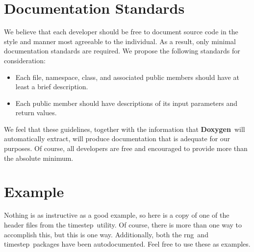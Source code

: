 \documentclass[11pt]{nmemo}
\newcommand{\doxy}{{\normalfont\bfseries Doxygen}}
\newcommand{\rng}{{\normalfont\sffamily rng}}
\newcommand{\timestep}{{\normalfont\sffamily timestep}}
\begin{document}
\section{Documentation Standards}

We believe that each developer should be free to document source code
in the style and manner most agreeable to the individual. As a result,
only minimal documentation standards are required.  We propose the
following standards for consideration:

\begin{itemize}
\item Each file, namespace, class, and associated public members
  should have at least a brief description.
\item Each public member should have descriptions of its input
  parameters and return values.
\end{itemize}

We feel that these guidelines, together with the information that
\doxy\ will automatically extract, will produce documentation that is
adequate for our purposes. Of course, all developers are free and
encouraged to provide more than the absolute minimum.


\section{Example}

Nothing is as instructive as a good example, so here is a copy of
one of the header files from the \timestep\ utility. Of course,
there is more than one way to accomplish this, but this is one way.
Additionally, both the \rng\ and \timestep\ packages have been
autodocumented.  Feel free to use these as examples.
\end{document}
